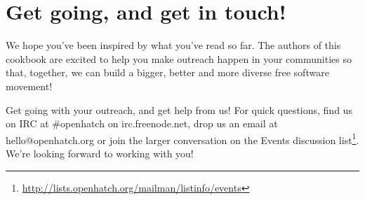 \chapter{Get going, and get in touch!}
We hope you’ve been inspired by what you’ve read so far. The authors of this cookbook are excited to help you make outreach happen in your communities so that, together, we can build a bigger, better and more diverse free software movement!

Get going with your outreach, and get help from us! For quick questions, find us on IRC at \#openhatch on irc.freenode.net, drop us an email at hello@openhatch.org or join the larger conversation on the Events discussion list\footnote{\url{http://lists.openhatch.org/mailman/listinfo/events}}. We’re looking forward to working with you!